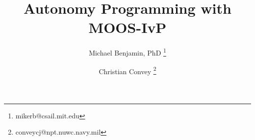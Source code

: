 \documentclass[letterpaper,10pt]{book}
\begin{document}
\frontmatter

\begin{titlepage}
\title{Autonomy Programming with MOOS-IvP}
\author{
	Michael Benjamin, PhD
	\thanks{mikerb@csail.mit.edu}
\and
	Christian Convey
	\thanks{conveycj@npt.nuwc.navy.mil}
}
\date{}
\maketitle
\end{titlepage}

\tableofcontents

\mainmatter






\appendix





\backmatter

\end{document}
